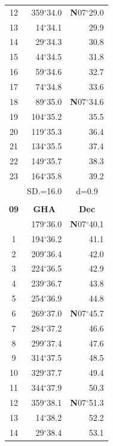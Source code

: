 \documentclass[10pt, a4paper]{report}
\begin{document}
\begin{scriptsize}
\begin{tabular*}{0.2\textwidth}[t]{@{\extracolsep{\fill}}|c|rr|}
12 & 359$^\circ$34.0 & \textbf{N}07$^\circ$29.0\\
13 & 14$^\circ$34.1 & 29.9\\
14 & 29$^\circ$34.3 & 30.8\\
15 & 44$^\circ$34.5 & \raisebox{0.24ex}{\boldmath$\cdot$~\boldmath$\cdot$~~}31.8\\
16 & 59$^\circ$34.6 & 32.7\\
17 & 74$^\circ$34.8 & 33.6\\[2Pt]
18 & 89$^\circ$35.0 & \textbf{N}07$^\circ$34.6\\
19 & 104$^\circ$35.2 & 35.5\\
20 & 119$^\circ$35.3 & 36.4\\
21 & 134$^\circ$35.5 & \raisebox{0.24ex}{\boldmath$\cdot$~\boldmath$\cdot$~~}37.4\\
22 & 149$^\circ$35.7 & 38.3\\
23 & 164$^\circ$35.8 & 39.2\\
\hline
\rule{0pt}{2.4ex} & \multicolumn{1}{c}{SD.=16.0} & \multicolumn{1}{c|}{d=0.9}\\
\hline
\multicolumn{1}{c}{}\\[-0.5ex]\hline
\multicolumn{1}{|c|}{\rule{0pt}{2.6ex}\textbf{09}} & \multicolumn{1}{c}{\textbf{GHA}} & \multicolumn{1}{c|}{\textbf{Dec}}\\
\hline\rule{0pt}{2.6ex}\noindent
0 & 179$^\circ$36.0 & \textbf{N}07$^\circ$40.1\\
1 & 194$^\circ$36.2 & 41.1\\
2 & 209$^\circ$36.4 & 42.0\\
3 & 224$^\circ$36.5 & \raisebox{0.24ex}{\boldmath$\cdot$~\boldmath$\cdot$~~}42.9\\
4 & 239$^\circ$36.7 & 43.8\\
5 & 254$^\circ$36.9 & 44.8\\[2Pt]
6 & 269$^\circ$37.0 & \textbf{N}07$^\circ$45.7\\
7 & 284$^\circ$37.2 & 46.6\\
8 & 299$^\circ$37.4 & 47.6\\
9 & 314$^\circ$37.5 & \raisebox{0.24ex}{\boldmath$\cdot$~\boldmath$\cdot$~~}48.5\\
10 & 329$^\circ$37.7 & 49.4\\
11 & 344$^\circ$37.9 & 50.3\\[2Pt]
12 & 359$^\circ$38.1 & \textbf{N}07$^\circ$51.3\\
13 & 14$^\circ$38.2 & 52.2\\
14 & 29$^\circ$38.4 & 53.1\\

\end{tabular*}
\end{scriptsize}
\end{document}
